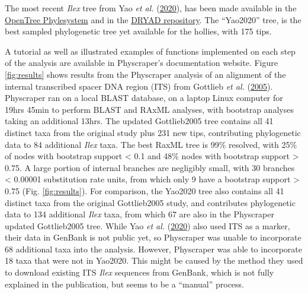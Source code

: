 \documentclass[]{article}
\begin{document}
The most recent \emph{Ilex} tree from Yao \emph{et al.} (\protect\hyperlink{ref-yao2020phylogeny}{2020}), has been made available in the \href{https://tree.opentreeoflife.org/curator/study/view/ot_1984}{OpenTree Phylesystem} and in the \href{https://datadryad.org/stash/dataset/doi:10.5061/dryad.k0p2ngf4x}{DRYAD repository}. The ``Yao2020'' tree, is the best sampled phylogenetic tree yet available for the hollies, with 175 tips.

A tutorial as well as illustrated examples of functions implemented on each step of the analysis are available in Physcraper's documentation website.
Figure \ref{fig:results} shows results from the Physcraper analysis of an alignment of the internal transcribed spacer DNA region (ITS) from Gottlieb \emph{et al.} (\protect\hyperlink{ref-gottlieb2005molecular}{2005}). Physcraper ran on a local BLAST database, on a laptop Linux computer for 19hrs 45min to perform BLAST and RAxML analyses, with bootstrap analyses taking an additional 13hrs.
The updated Gottlieb2005 tree contains all 41 distinct taxa from the original study plus 231 new tips, contributing phylogenetic data to 84 additional \emph{Ilex} taxa. The best RaxML tree is 99\% resolved, with 25\% of nodes with bootstrap support \textless{} 0.1 and 48\% nodes with bootstrap support \textgreater{} 0.75.
A large portion of internal branches are negligibly small, with 30 branches \textless{} 0.00001 substitution rate units, from which only 9 have a bootstrap support \textgreater{} 0.75 (Fig. \ref{fig:results}).
For comparison, the Yao2020 tree also contains all 41 distinct taxa from the original Gottlieb2005 study,
and contributes phylogenetic data to 134 additional \emph{Ilex} taxa, from which
67 are also in the Physcraper updated Gottlieb2005 tree. While Yao \emph{et al.} (\protect\hyperlink{ref-yao2020phylogeny}{2020}) also used ITS as a marker, their data in GenBank is not public yet, so Physcraper was unable to incorporate 68 additional taxa into the analysis. However, Physcraper was able to incorporate 18 taxa that were not in Yao2020.
This might be caused by the method they used to download existing ITS \emph{Ilex} sequences from GenBank, which is not fully explained in the publication, but seems to be a ``manual'' process.
\end{document}
